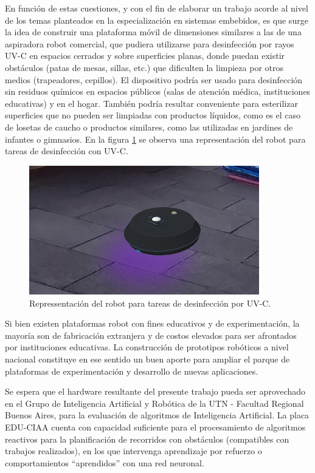 En función de estas cuestiones, y con el fin de elaborar un trabajo acorde al nivel de los temas planteados en la especialización en sistemas embebidos, es que surge la idea de construir una plataforma móvil de dimensiones similares a las de una aspiradora robot comercial, que pudiera utilizarse para desinfección por rayos UV-C en espacios cerrados y sobre superficies planas, donde puedan existir obstáculos (patas de mesas, sillas, etc.) que dificulten la limpieza por otros medios (trapeadores, cepillos). El dispositivo podría ser usado para desinfección sin residuos químicos en espacios públicos (salas de atención médica, instituciones educativas) y en el hogar. También podría resultar conveniente para esterilizar superficies que no pueden ser limpiadas con productos líquidos, como es el caso de losetas de caucho o productos similares, como las utilizadas en jardines de infantes o gimnasios. En la figura \ref{fig:ruvot} se observa una representación del robot para tareas de desinfección con UV-C.


\begin{figure}[h]
	\centering
	\includegraphics[width=10cm]{./Figures/rUVot14.png}
	\caption{Repressentación del robot para tareas de desinfección por UV-C.}
	\label{fig:ruvot}
\end{figure}




Si bien existen plataformas robot con fines educativos y de experimentación, la mayoría son de fabricación extranjera y de costos elevados para ser afrontados por instituciones educativas. La construcción de prototipos robóticos a nivel nacional constituye en ese sentido un buen aporte para ampliar el parque de plataformas de experimentación y desarrollo de nuevas aplicaciones.

Se espera que el hardware resultante del presente trabajo pueda ser aprovechado en el Grupo de Inteligencia Artificial y Robótica de la UTN - Facultad Regional Buenos Aires, para la evaluación de algoritmos de Inteligencia Artificial. La placa EDU-CIAA cuenta con capacidad suficiente para el procesamiento de algoritmos reactivos para la planificación de recorridos con obstáculos (compatibles con trabajos realizados), en los que intervenga aprendizaje por refuerzo o comportamientos “aprendidos” con una red neuronal. 

